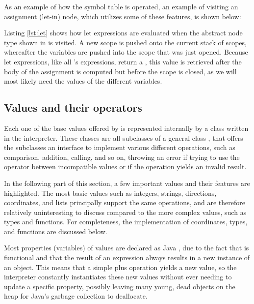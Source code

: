 As an example of how the symbol table is operated, an example of
visiting an assignment (let-in) node, which utilizes some of these
features, is shown below:



Listing \ref{lst:let} shows how let expressions are evaluated
when the abstract node type shown in  is
visited. A new scope is pushed onto the current stack of scopes,
whereafter the variables are pushed into the scope that was
just opened. Because let expressions, like all \productname{}'s
expressions, return a , this value is retrieved after
the body of the assignment is computed but before the scope is closed,
as we will most likely need the values of the different variables.

\subsection{Values and their operators}
\label{sec:valuesandtheiroperators}
Each one of the base values offered by \productname{} is represented
internally by a class written in the interpreter. These classes are
all subclasses of a general class , that offers the
subclasses an interface to implement various different operations, such
as comparison, addition, calling, and so on, throwing an error if trying
to use the operator between incompatible values or if the operation
yields an invalid result.

In the following part of this section, a few important values and their
features are highlighted. The most basic values such as integers,
strings, directions, coordinates, and lists principally support the
same operations, and are therefore relatively uninteresting to discuss
compared to the more complex values, such as types and functions. For
completeness, the implementation of coordinates, types, and
functions are discussed below.

Most properties (variables) of values are declared as Java
, due to the fact that \productname{} is functional and
that the result of an expression always results in a new instance of an
object. This means that a simple plus operation yields a new value, so
the interpreter constantly instantiates these new values without ever
needing to update a specific property, possibly leaving many young, dead
objects on the heap for Java's garbage collection to deallocate.

